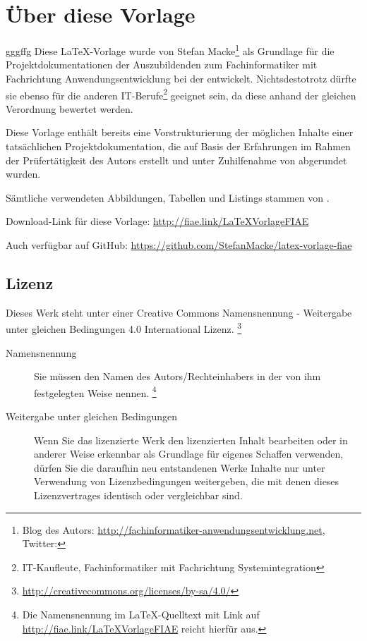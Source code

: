 \section*{Über diese Vorlage}
gggffg
Diese \LaTeX-Vorlage wurde von Stefan Macke\footnote{Blog des Autors:
\url{http://fachinformatiker-anwendungsentwicklung.net}, Twitter:
} als Grundlage für die Projektdokumentationen der Auszubildenden zum Fachinformatiker mit Fachrichtung
Anwendungsentwicklung bei der \AO entwickelt. Nichtsdestotrotz dürfte sie ebenso für die anderen IT-Berufe\footnote{\zB IT-Kaufleute, Fachinformatiker
mit Fachrichtung Systemintegration \usw} geeignet sein, da diese anhand der gleichen Verordnung bewertet werden.

Diese Vorlage enthält bereits eine Vorstrukturierung der möglichen Inhalte einer tatsächlichen Projektdokumentation, die auf Basis der
Erfahrungen im Rahmen der Prüfertätigkeit des Autors erstellt und unter Zuhilfenahme von \citet{Rohrer2011} abgerundet wurden.

Sämtliche verwendeten Abbildungen, Tabellen und Listings stammen von \citet{Grashorn2010}.

Download-Link für diese Vorlage: \url{http://fiae.link/LaTeXVorlageFIAE}

Auch verfügbar auf GitHub: \url{https://github.com/StefanMacke/latex-vorlage-fiae}

\subsection*{Lizenz}

\begin{center}
\end{center}
Dieses Werk steht unter einer Creative Commons Namensnennung - Weitergabe unter gleichen Bedingungen 4.0 International Lizenz.
\footnote{\url{http://creativecommons.org/licenses/by-sa/4.0/}}

\begin{center}
\end{center}

\begin{description}
	\item[Namensnennung] Sie müssen den Namen des Autors/Rechteinhabers in der von ihm festgelegten Weise nennen.
	\footnote{Die Namensnennung im \LaTeX-Quelltext mit Link auf \url{http://fiae.link/LaTeXVorlageFIAE} reicht hierfür aus.}
	\item[Weitergabe unter gleichen Bedingungen] Wenn Sie das lizenzierte Werk \bzw den lizenzierten Inhalt bearbeiten
	oder in anderer Weise erkennbar als Grundlage für eigenes Schaffen verwenden, dürfen Sie die daraufhin neu entstandenen
	Werke \bzw Inhalte nur unter Verwendung von Lizenzbedingungen weitergeben, die mit denen dieses Lizenzvertrages identisch oder vergleichbar sind.
\end{description}

